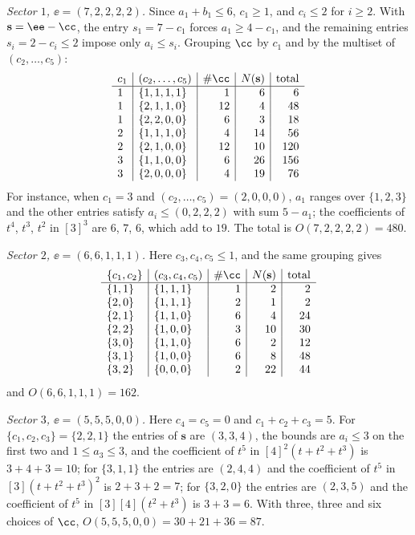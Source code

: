 \emph{Sector $1$, $\ee=(7,2,2,2,2)$.} Since $a_1+b_1\le6$, $c_1\ge1$, and
$c_i\le2$ for $i\ge2$. With $\mathbf s=\ee-\cc$, the entry $s_1=7-c_1$
forces $a_1\ge4-c_1$, and the remaining entries $s_i=2-c_i\le2$ impose only
$a_i\le s_i$. Grouping $\cc$ by $c_1$ and by the multiset of
$(c_2,\dots,c_5)$:
\[
\begin{array}{l|l|r|r|r}
c_1&(c_2,\dots,c_5)&\#\cc&N(\mathbf s)&\text{total}\\\hline
1&\{1,1,1,1\}&1&6&6\\
1&\{2,1,1,0\}&12&4&48\\
1&\{2,2,0,0\}&6&3&18\\
2&\{1,1,1,0\}&4&14&56\\
2&\{2,1,0,0\}&12&10&120\\
3&\{1,1,0,0\}&6&26&156\\
3&\{2,0,0,0\}&4&19&76
\end{array}
\]
For instance, when $c_1=3$ and $(c_2,\dots,c_5)=(2,0,0,0)$, $a_1$ ranges
over $\{1,2,3\}$ and the other entries satisfy $a_i\le(0,2,2,2)$ with sum
$5-a_1$; the coefficients of $t^4$, $t^3$, $t^2$ in $[3]^3$ are $6$, $7$,
$6$, which add to $19$. The total is $O(7,2,2,2,2)=480$.

\emph{Sector $2$, $\ee=(6,6,1,1,1)$.} Here $c_3,c_4,c_5\le1$, and the same
grouping gives
\[
\begin{array}{l|l|r|r|r}
\{c_1,c_2\}&(c_3,c_4,c_5)&\#\cc&N(\mathbf s)&\text{total}\\\hline
\{1,1\}&\{1,1,1\}&1&2&2\\
\{2,0\}&\{1,1,1\}&2&1&2\\
\{2,1\}&\{1,1,0\}&6&4&24\\
\{2,2\}&\{1,0,0\}&3&10&30\\
\{3,0\}&\{1,1,0\}&6&2&12\\
\{3,1\}&\{1,0,0\}&6&8&48\\
\{3,2\}&\{0,0,0\}&2&22&44
\end{array}
\]
and $O(6,6,1,1,1)=162$.

\emph{Sector $3$, $\ee=(5,5,5,0,0)$.} Here $c_4=c_5=0$ and
$c_1+c_2+c_3=5$. For $\{c_1,c_2,c_3\}=\{2,2,1\}$ the entries of
$\mathbf s$ are $(3,3,4)$, the bounds are $a_i\le3$ on the first two and
$1\le a_3\le3$, and the coefficient of $t^5$ in $[4]^2(t+t^2+t^3)$ is
$3+4+3=10$; for $\{3,1,1\}$ the entries are $(2,4,4)$ and the coefficient of
$t^5$ in $[3](t+t^2+t^3)^2$ is $2+3+2=7$; for $\{3,2,0\}$ the entries are
$(2,3,5)$ and the coefficient of $t^5$ in $[3][4](t^2+t^3)$ is $3+3=6$. With
three, three and six choices of $\cc$, $O(5,5,5,0,0)=30+21+36=87$.

